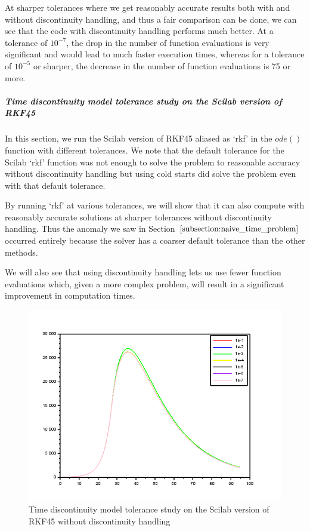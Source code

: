 At sharper tolerances where we get reasonably accurate results both with and without discontinuity handling, and thus a fair comparison can be done, we can see that the code with discontinuity handling performs much better. At a tolerance of $10^{-7}$, the drop in the number of function evaluations is very significant and would lead to much faster execution times, whereas for a tolerance of $10^{-5}$ or sharper, the decrease in the number of function evaluations is 75 or more.

\subparagraph{Time discontinuity model tolerance study on the Scilab version of RKF45}
In this section, we run the Scilab version of RKF45 aliased as `rkf' in the $ode()$ function with different tolerances. We note that the default tolerance for the Scilab `rkf' function was not enough to solve the problem to reasonable accuracy without discontinuity handling but using cold starts did solve the problem even with that default tolerance. 

By running `rkf' at various tolerances, we will show that it can also compute with reasonably accurate solutions at sharper tolerances without discontinuity handling. Thus the anomaly we saw in Section $\ref{subsection:naive_time_problem}$ occurred entirely because the solver has a coarser default tolerance than the other methods.

We will also see that using discontinuity handling lets us use fewer function evaluations which, given a more complex problem, will result in a significant improvement in computation times.

\begin{figure}[H]
\centering
\includegraphics[width=0.7\linewidth]{./figures/tolerance_time_rk45_no_event_sci}
\caption{Time discontinuity model tolerance study on the Scilab version of RKF45 without discontinuity handling}
\label{fig:tolerance_time_rk45_no_event_sci}
\end{figure}

